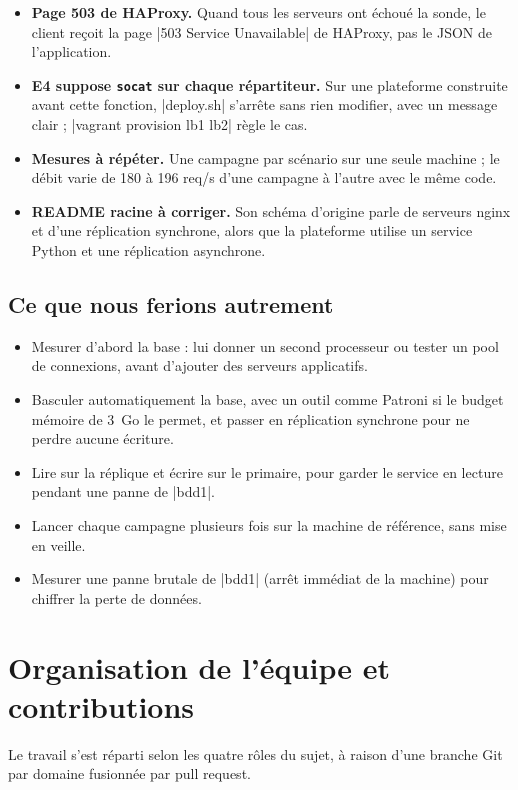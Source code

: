 \documentclass[a4paper,11pt]{article}
\begin{document}
\begin{itemize}
  \item \textbf{Page 503 de HAProxy.} Quand tous les serveurs ont échoué la sonde, le client reçoit la page |503 Service Unavailable| de HAProxy, pas le JSON de l'application.
  \item \textbf{E4 suppose \texttt{socat} sur chaque répartiteur.} Sur une plateforme construite avant cette fonction, |deploy.sh| s'arrête sans rien modifier, avec un message clair ; |vagrant provision lb1 lb2| règle le cas.
  \item \textbf{Mesures à répéter.} Une campagne par scénario sur une seule machine ; le débit varie de 180 à 196 req/s d'une campagne à l'autre avec le même code.
  \item \textbf{README racine à corriger.} Son schéma d'origine parle de serveurs nginx et d'une réplication synchrone, alors que la plateforme utilise un service Python et une réplication asynchrone.
\end{itemize}

\subsection{Ce que nous ferions autrement}
\begin{itemize}
  \item Mesurer d'abord la base : lui donner un second processeur ou tester un pool de connexions, avant d'ajouter des serveurs applicatifs.
  \item Basculer automatiquement la base, avec un outil comme Patroni si le budget mémoire de 3~Go le permet, et passer en réplication synchrone pour ne perdre aucune écriture.
  \item Lire sur la réplique et écrire sur le primaire, pour garder le service en lecture pendant une panne de |bdd1|.
  \item Lancer chaque campagne plusieurs fois sur la machine de référence, sans mise en veille.
  \item Mesurer une panne brutale de |bdd1| (arrêt immédiat de la machine) pour chiffrer la perte de données.
\end{itemize}

\section{Organisation de l'équipe et contributions}

Le travail s'est réparti selon les quatre rôles du sujet, à raison d'une branche Git par domaine fusionnée par pull request.
\end{document}
